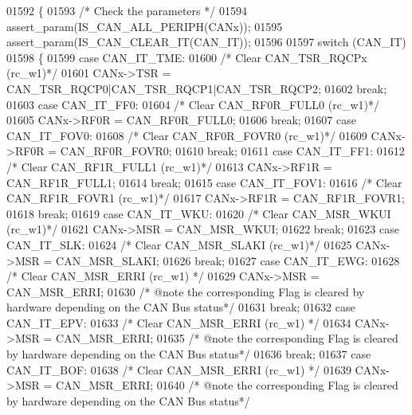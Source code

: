 \begin{DoxyCode}
01592 \{
01593   \textcolor{comment}{/* Check the parameters */}
01594   assert_param(IS_CAN_ALL_PERIPH(CANx));
01595   assert_param(IS_CAN_CLEAR_IT(CAN\_IT));
01596 
01597   \textcolor{keywordflow}{switch} (CAN\_IT)
01598   \{
01599     \textcolor{keywordflow}{case} CAN_IT_TME:
01600       \textcolor{comment}{/* Clear CAN\_TSR\_RQCPx (rc\_w1)*/}
01601       CANx->TSR = CAN_TSR_RQCP0|CAN_TSR_RQCP1|CAN_TSR_RQCP2;  
01602       \textcolor{keywordflow}{break};
01603     \textcolor{keywordflow}{case} CAN_IT_FF0:
01604       \textcolor{comment}{/* Clear CAN\_RF0R\_FULL0 (rc\_w1)*/}
01605       CANx->RF0R = CAN_RF0R_FULL0; 
01606       \textcolor{keywordflow}{break};
01607     \textcolor{keywordflow}{case} CAN_IT_FOV0:
01608       \textcolor{comment}{/* Clear CAN\_RF0R\_FOVR0 (rc\_w1)*/}
01609       CANx->RF0R = CAN_RF0R_FOVR0; 
01610       \textcolor{keywordflow}{break};
01611     \textcolor{keywordflow}{case} CAN_IT_FF1:
01612       \textcolor{comment}{/* Clear CAN\_RF1R\_FULL1 (rc\_w1)*/}
01613       CANx->RF1R = CAN_RF1R_FULL1;  
01614       \textcolor{keywordflow}{break};
01615     \textcolor{keywordflow}{case} CAN_IT_FOV1:
01616       \textcolor{comment}{/* Clear CAN\_RF1R\_FOVR1 (rc\_w1)*/}
01617       CANx->RF1R = CAN_RF1R_FOVR1; 
01618       \textcolor{keywordflow}{break};
01619     \textcolor{keywordflow}{case} CAN_IT_WKU:
01620       \textcolor{comment}{/* Clear CAN\_MSR\_WKUI (rc\_w1)*/}
01621       CANx->MSR = CAN_MSR_WKUI;  
01622       \textcolor{keywordflow}{break};
01623     \textcolor{keywordflow}{case} CAN_IT_SLK:
01624       \textcolor{comment}{/* Clear CAN\_MSR\_SLAKI (rc\_w1)*/} 
01625       CANx->MSR = CAN_MSR_SLAKI;   
01626       \textcolor{keywordflow}{break};
01627     \textcolor{keywordflow}{case} CAN_IT_EWG:
01628       \textcolor{comment}{/* Clear CAN\_MSR\_ERRI (rc\_w1) */}
01629       CANx->MSR = CAN_MSR_ERRI;
01630        \textcolor{comment}{/* @note the corresponding Flag is cleared by hardware depending on the CAN Bus status*/} 
01631       \textcolor{keywordflow}{break};
01632     \textcolor{keywordflow}{case} CAN_IT_EPV:
01633       \textcolor{comment}{/* Clear CAN\_MSR\_ERRI (rc\_w1) */}
01634       CANx->MSR = CAN_MSR_ERRI; 
01635        \textcolor{comment}{/* @note the corresponding Flag is cleared by hardware depending on the CAN Bus status*/}
01636       \textcolor{keywordflow}{break};
01637     \textcolor{keywordflow}{case} CAN_IT_BOF:
01638       \textcolor{comment}{/* Clear CAN\_MSR\_ERRI (rc\_w1) */} 
01639       CANx->MSR = CAN_MSR_ERRI; 
01640        \textcolor{comment}{/* @note the corresponding Flag is cleared by hardware depending on the CAN Bus status*/}

\end{DoxyCode}
